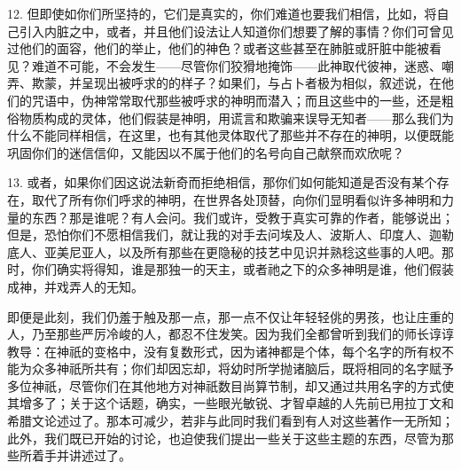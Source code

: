 12. 但即使如你们所坚持的，它们是真实的，你们难道也要我们相信，比如，将自己引入内脏之中，或者，并且他们设法让人知道你们想要了解的事情？你们可曾见过他们的面容，他们的举止，他们的神色？或者这些甚至在肺脏或肝脏中能被看见？难道不可能，不会发生——尽管你们狡猾地掩饰——此神取代彼神，迷惑、嘲弄、欺蒙，并呈现出被呼求的的样子？如果们，与占卜者极为相似，叙述说，在他们的咒语中，伪神常常取代那些被呼求的神明而潜入；而且这些中的一些，还是粗俗物质构成的灵体，他们假装是神明，用谎言和欺骗来误导无知者——那么我们为什么不能同样相信，在这里，也有其他灵体取代了那些并不存在的神明，以便既能巩固你们的迷信信仰，又能因以不属于他们的名号向自己献祭而欢欣呢？\par

13. 或者，如果你们因这说法新奇而拒绝相信，那你们如何能知道是否没有某个存在，取代了所有你们呼求的神明，在世界各处顶替，向你们显明看似许多神明和力量的东西？那是谁呢？有人会问。我们或许，受教于真实可靠的作者，能够说出；但是，恐怕你们不愿相信我们，就让我的对手去问埃及人、波斯人、印度人、迦勒底人、亚美尼亚人，以及所有那些在更隐秘的技艺中见识并熟稔这些事的人吧。那时，你们确实将得知，谁是那独一的天主，或者祂之下的众多神明是谁，他们假装成神，并戏弄人的无知。\par

即便是此刻，我们仍羞于触及那一点，那一点不仅让年轻轻佻的男孩，也让庄重的人，乃至那些严厉冷峻的人，都忍不住发笑。因为我们全都曾听到我们的师长谆谆教导：在神祇的变格中，没有复数形式，因为诸神都是个体，每个名字的所有权不能为众多神祇所共有；你们却因忘却，将幼时所学抛诸脑后，既将相同的名字赋予多位神祇，尽管你们在其他地方对神祇数目尚算节制，却又通过共用名字的方式使其增多了；关于这个话题，确实，一些眼光敏锐、才智卓越的人先前已用拉丁文和希腊文论述过了。那本可减少，若非与此同时我们看到有人对这些著作一无所知；此外，我们既已开始的讨论，也迫使我们提出一些关于这些主题的东西，尽管为那些所着手并讲述过了。\par

